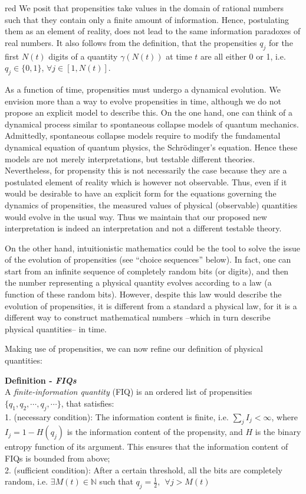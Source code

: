 \documentclass[aps,prl,twocolumn,showpacs,superscriptaddress,groupedaddress, nofootinbib]{revtex4-1}
\newcommand{\N}{\mathbb{N}}
\begin{document}
{red}{ We posit that propensities take values in the domain of rational numbers such that they contain only a finite amount of information. Hence, postulating them as an element of reality, does not lead to the same information paradoxes of real numbers.} It also follows from the definition, that the propensities $q_j$ for the first $N(t)$ digits of a quantity $\gamma(N(t))$ at time $t$ are all either 0 or 1, i.e. $q_j\in\{0,1\}$, $\forall j\in[1,N(t)]$.

As a function of time, propensities must undergo a dynamical evolution. We envision more than a way to evolve propensities in time, although we do not propose an explicit model to describe this. On the one hand, one can think of a dynamical process similar to spontaneous collapse models of quantum mechanics. Admittedly, spontaneous collapse models require to modify the fundamental dynamical equation of quantum physics, the Schr{\"o}dinger's equation. Hence these models are not merely interpretations, but testable different theories. Nevertheless, for propensity this is not necessarily the case because they are a postulated element of reality which is however not observable. Thus, even if it would be desirable to have an explicit form for the equations governing the dynamics of propensities, the measured values of physical (observable) quantities would evolve in the usual way. Thus we maintain that our proposed new interpretation is indeed an interpretation and not a different testable theory.

On the other hand, intuitionistic mathematics could be the tool to solve the issue of the evolution of propensities (see ``choice sequences'' below). In fact, one can start from an infinite sequence of completely random bits (or digits), and then the number representing a physical quantity evolves according to a law (a function of these random bits). However, despite this law would describe the evolution of propensities, it is different from a standard a physical law, for it is a different way to construct mathematical numbers --which in turn describe physical quantities-- in time.

Making use of propensities, we can now refine our definition of physical quantities:

\textbf{Definition - \textit{FIQs}}\\
A \emph{finite-information quantity} (FIQ) is an ordered list of propensities $\{ q_1, q_2, \cdots , q_j, \cdots \}$, that satisfies:\\
1. (necessary condition): The information content is finite, i.e.  $\sum_j I_j < \infty$, where $I_j=1-H(q_j)$ is the information content of the propensity, and $H$ is the binary entropy function of its argument. This ensures that the information content of FIQs is bounded from above;\\
2. (sufficient condition): After a certain threshold, all the bits are completely random, i.e. $\exists M(t) \in \N$ such that $q_j = \frac{1}{2}, \ \ \forall j>M(t)$\\
\end{document}
